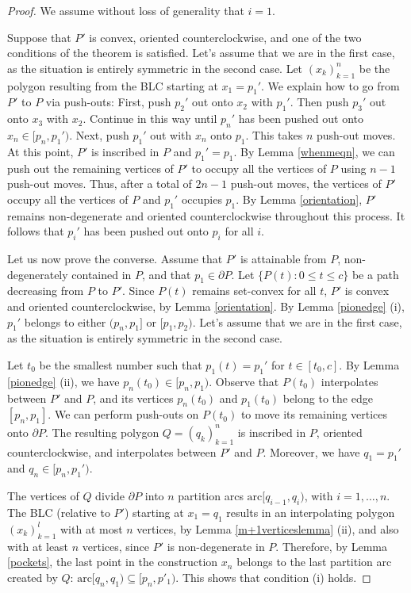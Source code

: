 \documentclass[11pt]{amsart}
\theoremstyle{remark}
\numberwithin{equation}{section}
\newcommand{\arc}{\mathrm{arc}}
\renewcommand{\leq}{\leqslant}
\begin{document}
\begin{proof}
We assume without loss of generality that $i=1$.

Suppose that $P'$ is convex, oriented counterclockwise, and one of the two conditions of the theorem is satisfied. Let's assume that we are in the first case, as the situation is entirely symmetric in the second case.  Let $(x_k)_{k=1}^n$ be the polygon resulting from the BLC starting at 
$x_1=p_1'$. We explain how to go from $P'$ to $P$ via push-outs: First, push $p_2'$ out onto $x_2$ with $p_1'$. Then push $p_3'$ out onto $x_3$ with $x_2$. Continue in this way until $p_n'$ has been pushed out onto $x_n\in [p_n,p_1')$. Next, push $p_1'$ out with $x_n$ onto $p_1$.
This takes $n$ push-out moves. At this point, $P'$ is inscribed in $P$ and  $p_1'=p_1$. By Lemma \ref{whenmeqn}, we can push out the remaining vertices of $P'$ to occupy all the vertices of $P$ using $n-1$ push-out moves. Thus, after a total of $2n-1$ push-out moves, the vertices of  $P'$ occupy all the vertices of $P$ and $p_1'$ occupies $p_1$. By Lemma \ref{orientation}, $P'$ remains non-degenerate and oriented counterclockwise throughout this process. It follows that $p_i'$ has been  pushed out onto $p_i$ for all $i$. 


Let us now prove the converse. Assume that $P'$ is attainable from $P$, non-degenerately contained in $P$, and that $p_1\in \partial P$. Let $\{P(t):0\leq t\leq c\}$ be a path decreasing from $P$ to $P'$. Since $P(t)$ remains set-convex for all $t$, $P'$ is convex and oriented counterclockwise, by Lemma \ref{orientation}.  By Lemma \ref{pionedge} (i), $p_1'$ belongs to either  $(p_n,p_1]$ or $[p_1,p_2)$. Let's assume that we are in the first case, as the situation is entirely symmetric in the second case. 

Let $t_0$ be the smallest number such that $p_1(t) = p_1'$ for $t\in [t_0,c]$. By Lemma \ref{pionedge} (ii), we have $p_n(t_0)\in [p_n,p_1)$. Observe that $P(t_0)$ interpolates between $P'$ and $P$, and its vertices $p_n(t_0)$ and $p_1(t_0)$ belong to the edge $[p_n,p_1]$. We can perform push-outs on $P(t_0)$ to move its remaining vertices onto $\partial P$. The resulting polygon $Q=(q_k)_{k=1}^n$ is inscribed in $P$,
oriented counterclockwise, and interpolates between $P'$ and $P$. Moreover, we have $q_1=p_1'$ and $q_n\in [p_n,p_1')$.


 The vertices of $Q$ divide $\partial P$ into $n$ partition arcs   $\arc[q_{i-1},q_i)$, with $i=1,\ldots,n$.
The BLC (relative to $P'$) starting at $x_1=q_1$  results in an interpolating polygon $(x_k)_{k=1}^l$ with at most $n$ vertices, by Lemma \ref{m+1verticeslemma} (ii), and also with at least $n$ vertices,  since $P'$ is non-degenerate in $P$. Therefore, by Lemma \ref{pockets}, the last point in the construction  $x_n$ belongs to the last partition arc created by $Q$: $\arc[q_n,q_1)\subseteq [p_n, p'_1)$. This shows that condition (i) holds.
\end{proof}
\end{document}
